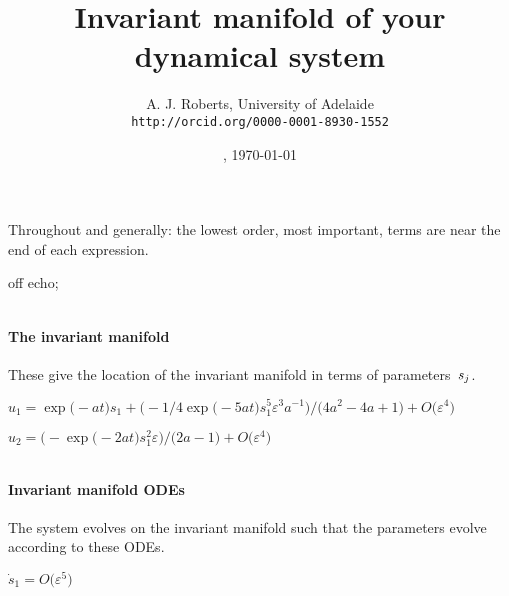 \documentclass[11pt,a5paper]{article}
\title{Invariant manifold of your dynamical system}
\author{A. J. Roberts, University of Adelaide\\
\texttt{http://orcid.org/0000-0001-8930-1552}}
\date{\now, \today}
\def\eps{\varepsilon} \def\_{_}
\begin{document}
\maketitle
Throughout and generally: the lowest order, most
important, terms are near the end of each expression.


off echo;


\(
\)
\paragraph{The invariant manifold}
These give the location of the invariant manifold in
terms of parameters~\(s\sb j\).
\(
\)\par

\(u_{1}=\exp \big(-a t\big) s_{1}+\big(-1/4 \exp \big(-5 a t\big) s_{1}^{5
} \eps^{3} a^{-1}\big)/\big(4 a^{2}-4 a+1\big)+O\big(\varepsilon ^{4}
\big)
\)\par

\(u_{2}=\big(-\exp \big(-2 a t\big) s_{1}^{2} \eps\big)/\big(2 a-1\big)+O
\big(\varepsilon ^{4}\big)
\)\par

\(
\)
\paragraph{Invariant manifold ODEs}
The system evolves on the invariant manifold such
that the parameters evolve according to these ODEs.
\(
\)\par

\(\dot s_{1}=O\big(\varepsilon ^{5}\big)
\)\par

\(
\)\par
\end{document}
